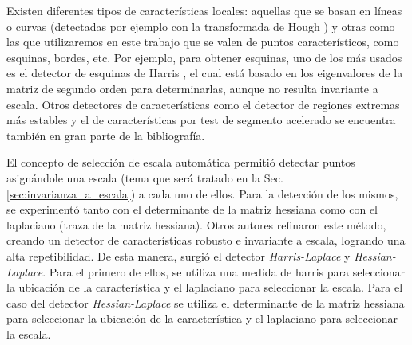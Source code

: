 Existen diferentes tipos de características locales: aquellas que se basan en líneas o curvas (detectadas por ejemplo con la transformada de Hough \cite{Duda:1972:UHT:361237.361242}) y otras como las que utilizaremos en este trabajo que se valen de puntos característicos, como esquinas, bordes, etc.
Por ejemplo, para obtener esquinas, uno de los más usados es el detector de esquinas de Harris \cite{Harris88acombined, citeulike:3484001}, el cual está basado en los eigenvalores de la matriz de segundo orden para determinarlas, aunque no resulta invariante a escala. Otros detectores de características como el detector de regiones extremas más estables %
\cite{DBLP:journals/ivc/MatasCUP04} y el de características por test de segmento acelerado %
\cite{Rosten05fusingpoints, citeulike:9456628} se encuentra también en gran parte de la bibliografía.

El concepto de selección de escala automática \cite{springerlink:10.1023/A:1008045108935} permitió detectar puntos asignándole una escala (tema que será tratado en la Sec. \ref{sec:invarianza_a_escala}) a cada uno de ellos. Para la detección de los mismos, se experimentó tanto con el determinante de la matriz hessiana como con el laplaciano (traza de la matriz hessiana). Otros autores \cite{conf/iccv/MikolajczykS01} refinaron este método, creando un detector de características robusto e invariante a escala, logrando una alta repetibilidad. De esta manera, surgió el detector \textit{Harris-Laplace} y \textit{Hessian-Laplace}. Para el primero de ellos, se utiliza una medida de harris para seleccionar la ubicación de la característica y el laplaciano para seleccionar la escala. Para el caso del detector \textit{Hessian-Laplace} se utiliza el determinante de la matriz hessiana para seleccionar la ubicación de la característica y el laplaciano para seleccionar la escala.

